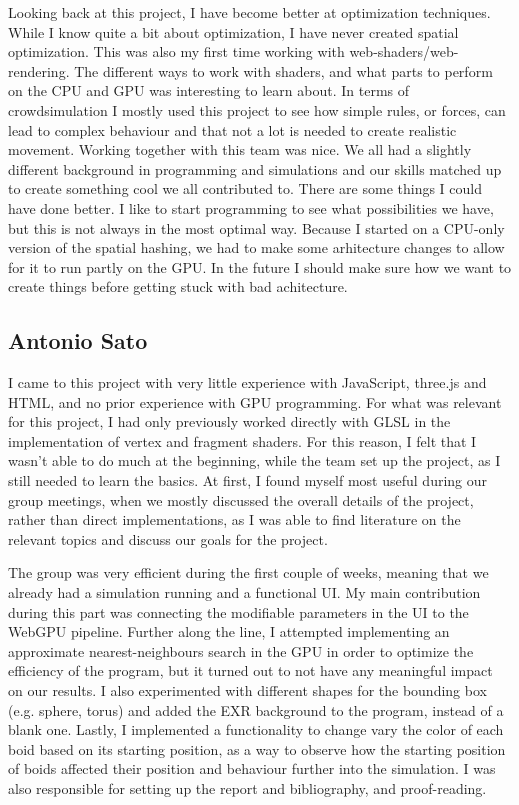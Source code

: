 \documentclass[a4paper, 12pt]{article}
\begin{document}
Looking back at this project, I have become better at optimization techniques.
While I know quite a bit about optimization, I have never created spatial
optimization. This was also my first time working with
web-shaders/web-rendering. The different ways to work with shaders, and what
parts to perform on the CPU and GPU was interesting to learn about. In terms of
crowdsimulation I mostly used this project to see how simple rules, or forces,
can lead to complex behaviour and that not a lot is needed to create realistic
movement. Working together with this team was nice. We all had a slightly
different background in programming and simulations and our skills matched up
to create something cool we all contributed to. There are some things I could
have done better. I like to start programming to see what possibilities we
have, but this is not always in the most optimal way. Because I started on a
CPU-only version of the spatial hashing, we had to make some arhitecture
changes to allow for it to run partly on the GPU. In the future I should make
sure how we want to create things before getting stuck with bad achitecture.

\subsection*{Antonio Sato}
I came to this project with very little experience with JavaScript, three.js and HTML, and no prior
experience with GPU programming. For what was relevant for this project, I had only previously worked
directly with GLSL in the implementation of vertex and fragment shaders. For this reason, I felt that
I wasn't able to do much at the beginning, while the team set up the project, as I still needed to
learn the basics. At first, I found myself most useful during our group meetings, when we mostly
discussed the overall details of the project, rather than direct implementations, as I was able to
find literature on the relevant topics and discuss our goals for the project. 

The group was very efficient during the first couple of weeks, meaning that we already had a simulation
running and a functional UI. My main contribution during this part was connecting the modifiable
parameters in the UI to the WebGPU pipeline. Further along the line, I attempted implementing an
approximate nearest-neighbours search in the GPU \cite{leite2012nearest} in order to optimize the
efficiency of the program, but it turned out to not have any meaningful impact on our results. I also
experimented with different shapes for the bounding box (e.g. sphere, torus) and added the EXR
background to the program, instead of a blank one. Lastly, I implemented a functionality to change
vary the color of each boid based on its starting position, as a way to observe how the starting
position of boids affected their position and behaviour further into the simulation. I was also
responsible for setting up the report and bibliography, and proof-reading.
\end{document}
